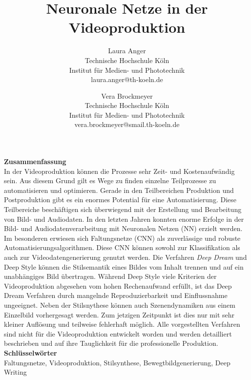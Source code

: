 \documentclass[times, 11pt,twocolumn]{article}
\begin{document}
\title{Neuronale Netze in der Videoproduktion}

\author{Laura Anger\\
Technische Hochschule K\"oln \\ Institut f\"ur Medien- und Phototechnik \\  laura.anger@th-koeln.de \\
\and
Vera Brockmeyer\\
Technische Hochschule K\"oln \\ Institut f\"ur Medien- und Phototechnik \\ vera.brockmeyer@smail.th-koeln.de \\
}

\maketitle
\thispagestyle{empty}


\large{\textbf{Zusammenfassung}}\\ \small %
{} 
In der Videoproduktion können die Prozesse sehr Zeit- und Kostenaufwändig sein. Aus diesem Grund gilt es Wege zu finden einzelne Teilprozesse zu automatisieren und optimieren. Gerade in den Teilbereichen Produktion und Postproduktion gibt es ein enormes Potential für eine Automatisierung. Diese Teilbereiche beschäftigen sich überwiegend mit der Erstellung und Bearbeitung von Bild- und Audiodaten. In den letzten Jahren konnten enorme Erfolge in der Bild- und Audiodatenverarbeitung mit Neuronalen Netzen (NN) erzielt werden. Im besonderen erwiesen sich Faltungsnetze (CNN) als zuverlässige und robuste Automatisierungsalgorithmen. Diese CNN können sowohl zur Klassifikation als auch zur Videodatengenerierung genutzt werden. Die Verfahren \textit{Deep Dream} und Deep Style können die Stilsemantik eines Bildes vom Inhalt trennen und auf ein unabhängiges Bild übertragen. Während Deep Style viele Kriterien der Videoproduktion abgesehen vom hohen Rechenaufwand erfüllt, ist das Deep Dream Verfahren durch mangelnde Reproduzierbarkeit und Einflussnahme ungeeignet. Neben der Stilsnythese können auch Szenendynamiken aus einem Einzelbild vorhergesagt werden. Zum jetzigen Zeitpunkt ist dies nur mit sehr kleiner Auflösung und teilweise fehlerhaft möglich. Alle vorgestellten Verfahren sind nicht für die Videoproduktion entwickelt worden und werden detailliert beschrieben und auf ihre Tauglichkeit für die professionelle Produktion. \\


\large{\textbf{Schl\"usselw\"orter}}\\ \small %
 Faltungsnetze, Videoproduktion, Stilsynthese, Bewegtbildgenerierung, Deep Writing
\end{document}
